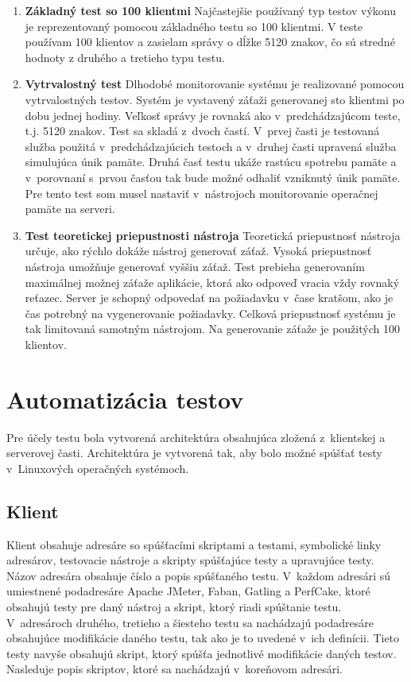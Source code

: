 \documentclass[12pt,oneside,final]{fithesis-utf8}
\begin{document}
\begin{enumerate}
\item \textbf{Základný test so 100 klientmi}
\newline
Najčastejšie používaný typ testov výkonu je reprezentovaný pomocou základného testu so 100 klientmi. V teste používam 100 klientov a zasielam správy o dĺžke 5120 znakov, čo sú stredné hodnoty z druhého a tretieho typu testu.
\newline

\item \textbf{Vytrvalostný test}
\newline
Dlhodobé monitorovanie systému je realizované pomocou vytrvalostných testov. Systém je vystavený záťaži generovanej sto klientmi po dobu jednej hodiny. Veľkosť správy je rovnaká ako v~predchádzajúcom teste, t.j. 5120 znakov. Test sa skladá z~dvoch častí. V~prvej časti je testovaná služba použitá v~predchádzajúcich testoch a v~druhej časti upravená služba simulujúca únik pamäte. Druhá časť testu ukáže rastúcu spotrebu pamäte a v~porovnaní s~prvou časťou tak bude možné odhaliť vzniknutý únik pamäte. Pre tento test som musel nastaviť v~nástrojoch monitorovanie operačnej pamäte na serveri.
\newline

\item \textbf{Test teoretickej priepustnosti nástroja}
\newline
Teoretická priepustnosť nástroja určuje, ako rýchlo dokáže nástroj generovať záťaž. Vysoká priepustnosť nástroja umožňuje generovať vyššiu záťaž. Test prebieha generovaním maximálnej možnej záťaže aplikácie, ktorá ako odpoveď vracia vždy rovnaký reťazec. Server je schopný odpovedať na požiadavku v~čase kratšom, ako je čas potrebný na vygenerovanie požiadavky. Celková priepustnosť systému je tak limitovaná samotným nástrojom. Na generovanie záťaže je použitých 100 klientov.

\end{enumerate}

\newpage
\section{Automatizácia testov}
Pre účely testu bola vytvorená architektúra obsahujúca zložená z~klientskej a serverovej časti. Architektúra je vytvorená tak, aby bolo možné spúšťať testy v~Linuxových operačných systémoch.

\subsection{Klient}
Klient obsahuje adresáre so spúšťacími skriptami a testami, symbolické linky adresárov, testovacie nástroje a skripty spúšťajúce testy a upravujúce testy. Názov adresára obsahuje číslo a popis spúšťaného testu. V~každom adresári sú umiestnené podadresáre Apache JMeter, Faban, Gatling a PerfCake, ktoré obsahujú testy pre daný nástroj a skript, ktorý riadi spúštanie testu. V~adresároch druhého, tretieho a šiesteho testu sa nachádzajú podadresáre obsahujúce modifikácie daného testu, tak ako je to uvedené v~ich definícii. Tieto testy navyše obsahujú skript, ktorý spúšťa jednotlivé modifikácie daných testov. Nasleduje popis skriptov, ktoré sa nachádzajú v~koreňovom adresári.	
\end{document}

